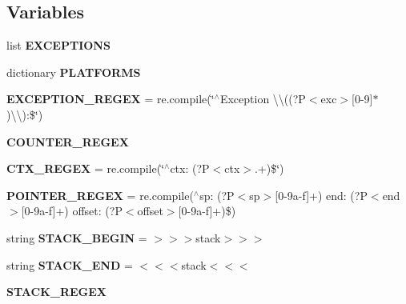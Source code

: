 \subsection*{Variables}
\begin{DoxyCompactItemize}
\item 
\mbox{\label{namespacedecoder_a9a000bcf9aeda05a334a99f023e59b95}} 
list {\bfseries E\+X\+C\+E\+P\+T\+I\+O\+NS}
\item 
dictionary {\bfseries P\+L\+A\+T\+F\+O\+R\+MS}
\item 
\mbox{\label{namespacedecoder_a872fb10c414b933ca47c8258749e55d6}} 
{\bfseries E\+X\+C\+E\+P\+T\+I\+O\+N\+\_\+\+R\+E\+G\+EX} = re.\+compile(\char`\"{}$^\wedge$Exception \textbackslash{}\textbackslash{}((?P$<$exc$>$\mbox{[}0-\/9\mbox{]}$\ast$)\textbackslash{}\textbackslash{})\+:\$\char`\"{})
\item 
{\bfseries C\+O\+U\+N\+T\+E\+R\+\_\+\+R\+E\+G\+EX}
\item 
\mbox{\label{namespacedecoder_ad18cc14fb5d58c9b49e56b56826c5ec1}} 
{\bfseries C\+T\+X\+\_\+\+R\+E\+G\+EX} = re.\+compile(\char`\"{}$^\wedge$ctx\+: (?P$<$ctx$>$.+)\$\char`\"{})
\item 
\mbox{\label{namespacedecoder_abf5346d8fbb225f94c2df2eadb313512}} 
{\bfseries P\+O\+I\+N\+T\+E\+R\+\_\+\+R\+E\+G\+EX} = re.\+compile(\textquotesingle{}$^\wedge$sp\+: (?P$<$sp$>$\mbox{[}0-\/9a-\/f\mbox{]}+) end\+: (?\+P$<$end$>$\mbox{[}0-\/9a-\/f\mbox{]}+) offset\+: (?\+P$<$offset$>$\mbox{[}0-\/9a-\/f\mbox{]}+)\$\textquotesingle{})
\item 
\mbox{\label{namespacedecoder_a653689b0368bee2d1a6619d0a6a48a60}} 
string {\bfseries S\+T\+A\+C\+K\+\_\+\+B\+E\+G\+IN} = \textquotesingle{}$>$$>$$>$stack$>$$>$$>$\textquotesingle{}
\item 
\mbox{\label{namespacedecoder_a037630a3f47c24159ea9680f7aa31851}} 
string {\bfseries S\+T\+A\+C\+K\+\_\+\+E\+ND} = \textquotesingle{}$<$$<$$<$stack$<$$<$$<$\textquotesingle{}
\item 
{\bfseries S\+T\+A\+C\+K\+\_\+\+R\+E\+G\+EX}
\item 
\mbox{\label{namespacedecoder_a69e0a99334dd1534e0d172b5e3891745}} 

\end{DoxyCompactItemize}
